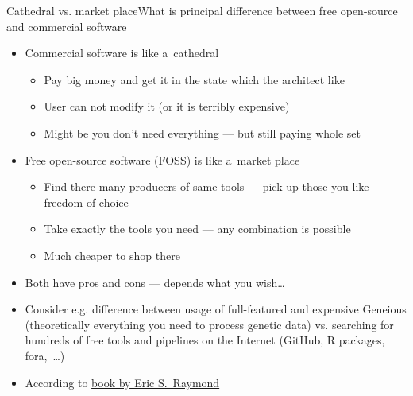 \documentclass[compress, xelatex, 11pt, xcolor=svgnames, aspectratio=169, url={hyphens, lowtilde}]{beamer}
\begin{document}
\begin{frame}{Cathedral vs. market place}{What is principal difference between free open-source and commercial software}
	\begin{itemize}
		\item Commercial software is like a~cathedral
		\begin{itemize}
			\item Pay big money and get it in the state which the architect like
			\item User can not modify it (or it is terribly expensive)
			\item Might be you don't need everything --- but still paying whole set
		\end{itemize}
		\item Free open-source software (FOSS) is like a~market place
		\begin{itemize}
			\item Find there many producers of same tools --- pick up those you like --- freedom of choice
			\item Take exactly the tools you need --- any combination is possible
			\item Much cheaper to shop there
		\end{itemize}
		\item Both have pros and cons --- depends what you wish\ldots
		\item Consider e.g. difference between usage of full-featured and expensive Geneious (theoretically everything you need to process genetic data) vs. searching for hundreds of free tools and pipelines on the Internet (GitHub, R packages, fora,~\ldots)
		\item According to \href{https://en.wikipedia.org/wiki/The_Cathedral_and_the_Bazaar}{book by Eric S.~Raymond}
	\end{itemize}
\end{frame}
\end{document}
